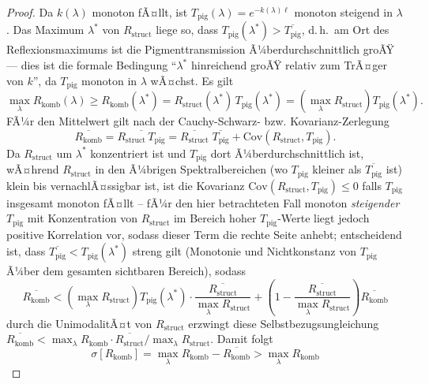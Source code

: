 ﻿\documentclass[a4paper,12pt]{article}
\theoremstyle{definition}
\begin{document}
\begin{proof}
	Da $k(\lambda)$ monoton fÃ¤llt, ist $T_{\mathrm{pig}}(\lambda)=
	e^{-k(\lambda)\ell}$ monoton steigend in $\lambda$. Das Maximum
	$\lambda^*$ von $R_{\mathrm{struct}}$ liege so, dass
	$T_{\mathrm{pig}}(\lambda^*) > \overline{T_{\mathrm{pig}}}$, d.\,h.\ am
	Ort des Reflexionsmaximums ist die Pigmenttransmission
	Ã¼berdurchschnittlich groÃŸ --- dies ist die formale Bedingung
	``$\lambda^*$ hinreichend groÃŸ relativ zum TrÃ¤ger von $k$'', da
	$T_{\mathrm{pig}}$ monoton in $\lambda$ wÃ¤chst.
	Es gilt
	\[
	\max_\lambda R_{\mathrm{komb}}(\lambda) \ge
	R_{\mathrm{komb}}(\lambda^*) =
	R_{\mathrm{struct}}(\lambda^*)\,T_{\mathrm{pig}}(\lambda^*)
	= \left(\max_\lambda R_{\mathrm{struct}}\right) T_{\mathrm{pig}}(\lambda^*).
	\]
	FÃ¼r den Mittelwert gilt nach der Cauchy-Schwarz- bzw.
	Kovarianz-Zerlegung
	\[
	\overline{R_{\mathrm{komb}}} = \overline{R_{\mathrm{struct}}\,
		T_{\mathrm{pig}}}
	= \overline{R_{\mathrm{struct}}}\;\overline{T_{\mathrm{pig}}}
	+ \mathrm{Cov}(R_{\mathrm{struct}}, T_{\mathrm{pig}}).
	\]
	Da $R_{\mathrm{struct}}$ um $\lambda^*$ konzentriert ist und
	$T_{\mathrm{pig}}$ dort Ã¼berdurchschnittlich ist, wÃ¤hrend
	$R_{\mathrm{struct}}$ in den Ã¼brigen Spektralbereichen (wo
	$T_{\mathrm{pig}}$ kleiner als $\overline{T_{\mathrm{pig}}}$ ist) klein
	bis vernachlÃ¤ssigbar ist, ist die Kovarianz $\mathrm{Cov}(R_{\mathrm{struct}},
	T_{\mathrm{pig}}) \le 0$ falls $T_{\mathrm{pig}}$ insgesamt monoton fÃ¤llt
	-- fÃ¼r den hier betrachteten Fall monoton \emph{steigender}
	$T_{\mathrm{pig}}$ mit Konzentration von $R_{\mathrm{struct}}$ im Bereich
	hoher $T_{\mathrm{pig}}$-Werte liegt jedoch positive Korrelation vor,
	sodass dieser Term die rechte Seite anhebt; entscheidend ist, dass
	$\overline{T_{\mathrm{pig}}} < T_{\mathrm{pig}}(\lambda^*)$ streng gilt
	(Monotonie und Nichtkonstanz von $T_{\mathrm{pig}}$ Ã¼ber dem gesamten
	sichtbaren Bereich), sodass
	\[
	\overline{R_{\mathrm{komb}}} <
	\left(\max_\lambda R_{\mathrm{struct}}\right) T_{\mathrm{pig}}(\lambda^*)
	\cdot \frac{\overline{R_{\mathrm{struct}}}}{\max_\lambda R_{\mathrm{struct}}}
	+ \left(1-\frac{\overline{R_{\mathrm{struct}}}}{\max_\lambda R_{\mathrm{struct}}}\right)
	\overline{R_{\mathrm{komb}}}
	\]
	durch die UnimodalitÃ¤t von $R_{\mathrm{struct}}$ erzwingt diese
	Selbstbezugsungleichung
	$\overline{R_{\mathrm{komb}}} < \max_\lambda R_{\mathrm{komb}}
	\cdot \overline{R_{\mathrm{struct}}}/\max_\lambda R_{\mathrm{struct}}$.
	Damit folgt
	\[
	\sigma[R_{\mathrm{komb}}] = \max_\lambda R_{\mathrm{komb}}
	- \overline{R_{\mathrm{komb}}}
	> \max_\lambda R_{\mathrm{komb}}
\]
\end{proof}
\end{document}
